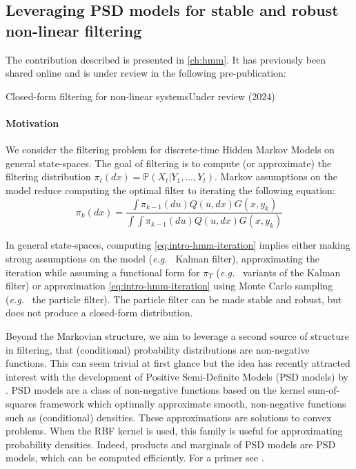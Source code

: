 \subsection{Leveraging PSD models for stable and robust non-linear filtering}
\begin{mdframed}
The contribution described is presented in \cref{ch:hmm}.
\noindent It has previously been shared online and is under review in the following pre-publication:
\begin{mdframed}
{Closed-form filtering for non-linear systems}{Under review (2024)}
\end{mdframed}
\end{mdframed}

\paragraph{Motivation}
We consider the filtering problem for discrete-time Hidden Markov Models on general state-spaces. The goal of filtering is to compute (or approximate) the filtering distribution $\pi_t(dx) = \mathbb P(X_t\vert Y_1, \ldots, Y_{t})$. Markov assumptions on the model reduce computing the optimal filter to iterating the following equation:
\begin{equation}\label{eq:intro-hmm-iteration}
\pi_k(dx) = \frac{\int \pi_{k-1}(du)Q(u, dx)G(x, y_k)}{\int \int \pi_{k-1}(du)Q(u, dx)G(x, y_k)}
\end{equation}

In general state-spaces, computing \cref{eq:intro-hmm-iteration} implies either making strong assumptions on the model (\emph{e.g.\ } Kalman filter), approximating the iteration while assuming a functional form for $\pi_T$ (\emph{e.g.\ } variants of the Kalman filter) or approximation \cref{eq:intro-hmm-iteration} using Monte Carlo sampling (\emph{e.g.\ } the particle filter). The particle filter can be made stable and robust, but does not produce a closed-form distribution.

Beyond the Markovian structure, we aim to leverage a second source of structure in filtering, that (conditional) probability distributions are non-negative functions. This can seem trivial at first glance but the idea has recently attracted interest with the development of Positive Semi-Definite Models (PSD models) by \citet{ulysse-non-negative}. PSD models are a class of non-negative functions based on the kernel sum-of-squares framework which optimally approximate smooth, non-negative functions such as (conditional) densities. These approximations are solutions to convex problems. When the RBF kernel is used, this family is useful for approximating probability densities. Indeed, products and marginals of PSD models are PSD models, which can be computed efficiently. For a primer see \citep{ciliberto2021,sampling-ulysse}.



